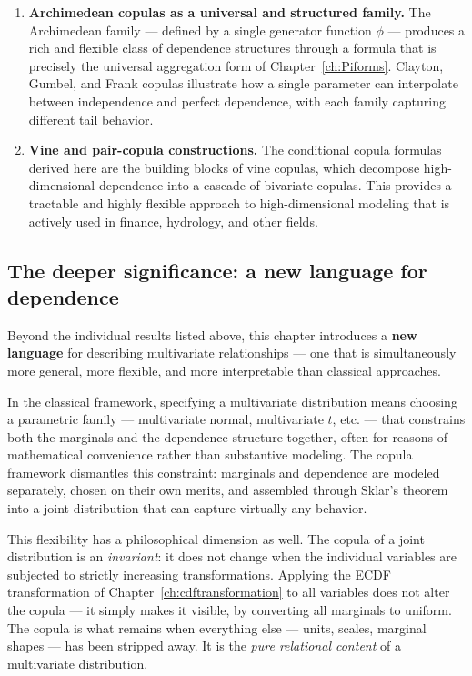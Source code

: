 \begin{enumerate}
\item \textbf{Archimedean copulas as a universal and structured family.} The
Archimedean family — defined by a single generator function $\phi$ — produces a
rich and flexible class of dependence structures through a formula that is precisely
the universal aggregation form of Chapter~\ref{ch:Piforms}. Clayton, Gumbel, and
Frank copulas illustrate how a single parameter can interpolate between independence
and perfect dependence, with each family capturing different tail behavior.

\item \textbf{Vine and pair-copula constructions.} The conditional copula formulas
derived here are the building blocks of vine copulas, which decompose high-dimensional
dependence into a cascade of bivariate copulas. This provides a tractable and highly
flexible approach to high-dimensional modeling that is actively used in finance,
hydrology, and other fields.

\end{enumerate}

\subsection{The deeper significance: a new language for dependence}

Beyond the individual results listed above, this chapter introduces a \textbf{new
language} for describing multivariate relationships — one that is simultaneously more
general, more flexible, and more interpretable than classical approaches.

In the classical framework, specifying a multivariate distribution means choosing a
parametric family — multivariate normal, multivariate $t$, etc. — that constrains
both the marginals and the dependence structure together, often for reasons of
mathematical convenience rather than substantive modeling. The copula framework
dismantles this constraint: marginals and dependence are modeled separately, chosen
on their own merits, and assembled through Sklar's theorem into a joint distribution
that can capture virtually any behavior.

This flexibility has a philosophical dimension as well. The copula of a joint
distribution is an \emph{invariant}: it does not change when the individual variables
are subjected to strictly increasing transformations. Applying the ECDF
transformation of Chapter~\ref{ch:cdftransformation} to all variables does not alter
the copula — it simply makes it visible, by converting all marginals to uniform. The
copula is what remains when everything else — units, scales, marginal shapes — has
been stripped away. It is the \emph{pure relational content} of a multivariate
distribution.

